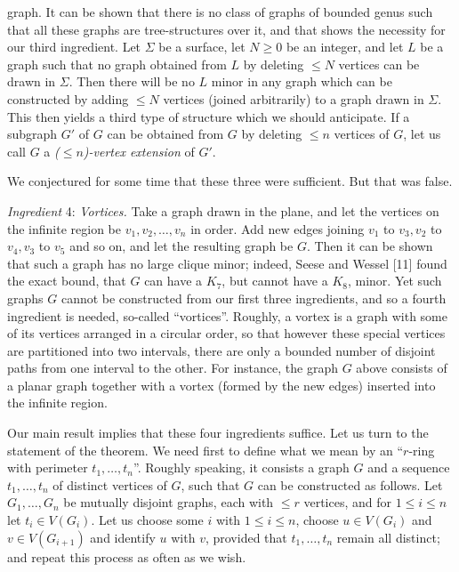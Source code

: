 \noindent graph. It can be shown that there is no class of graphs of bounded genus such that all these graphs are tree-structures over it, and that shows the necessity for our third ingredient. Let $\Sigma$ be a surface, let $N \ge 0$ be an integer, and let $L$ be a graph such that no graph obtained from $L$ by deleting $\le N$ vertices can be drawn in $\Sigma$. Then there will be no $L$ minor in any graph which can be constructed by adding $\le N$ vertices (joined arbitrarily) to a graph drawn in $\Sigma$. This then yields a third type of structure which we should anticipate. If a subgraph $G'$ of $G$ can be obtained from $G$ by deleting $\le n$ vertices of $G$, let us call $G$ a \textit{($\le n$)-vertex extension} of $G'$.

We conjectured for some time that these three were sufficient. But that was false.

\textit{Ingredient} 4: \textit{Vortices.} Take a graph drawn in the plane, and let the vertices on the infinite region be $v_1, v_2, \dots, v_n$ in order. Add new edges joining $v_1$ to $v_3, v_2$ to $v_4, v_3$ to $v_5$ and so on, and let the resulting graph be $G$. Then it can be shown that such a graph has no large clique minor; indeed, Seese and Wessel [11] found the exact bound, that $G$ can have a $K_7$, but cannot have a $K_8$, minor. Yet such graphs $G$ cannot be constructed from our first three ingredients, and so a fourth ingredient is needed, so-called ``vortices''. Roughly, a vortex is a graph with some of its vertices arranged in a circular order, so that however these special vertices are partitioned into two intervals, there are only a bounded number of disjoint paths from one interval to the other. For instance, the graph $G$ above consists of a planar graph together with a vortex (formed by the new edges) inserted into the infinite region.

Our main result implies that these four ingredients suffice. Let us turn to the statement of the theorem. We need first to define what we mean by an ``$r$-ring with perimeter $t_1, \dots, t_n$''. Roughly speaking, it consists a graph $G$ and a sequence $t_1, \dots, t_n$ of distinct vertices of $G$, such that $G$ can be constructed as follows. Let $G_1, \dots, G_n$ be mutually disjoint graphs, each with $\le r$ vertices, and for $1 \le i \le n$ let $t_i \in V(G_i)$. Let us choose some $i$ with $1 \le i \le n$, choose $u \in V(G_i)$ and $v \in V(G_{i+1})$ and identify $u$ with $v$, provided that $t_1, \dots, t_n$ remain all distinct; and repeat this process as often as we wish.

